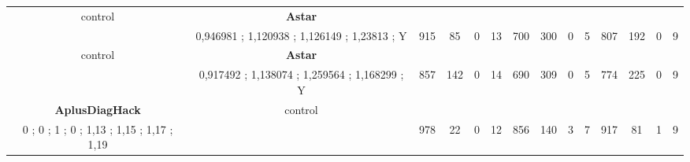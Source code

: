 \begin{table}[]
{\begin{tabular}{|c|c|c|c|c|c|c|c|c|c|c|c|c|c|}
control & \cellcolor{blue!15}\textbf{Astar}& {\color[HTML]{00009B} } & {\color[HTML]{9A0000} } & {\color[HTML]{009901} } &  & {\color[HTML]{00009B} } & {\color[HTML]{9A0000} } & {\color[HTML]{009901} } &  & {\color[HTML]{00009B} } & {\color[HTML]{9A0000} } & {\color[HTML]{009901} } &  \\ 
 & \cellcolor{ blue!15}0,946981 ; 1,120938 ; 1,126149 ; 1,23813 ; Y & \multirow{-2}{*}{{\color[HTML]{00009B} 915}} & \multirow{-2}{*}{{\color[HTML]{9A0000} 85}} & \multirow{-2}{*}{{\color[HTML]{009901} 0}} & \multirow{-2}{*}{13} & \multirow{-2}{*}{{\color[HTML]{00009B} 700}} & \multirow{-2}{*}{{\color[HTML]{9A0000} 300}} & \multirow{-2}{*}{{\color[HTML]{009901} 0}} & \multirow{-2}{*}{5} & \multirow{-2}{*}{{\color[HTML]{00009B} 807}} & \multirow{-2}{*}{{\color[HTML]{9A0000} 192}} & \multirow{-2}{*}{{\color[HTML]{009901} 0}} & \multirow{-2}{*}{9} \\ \hline

control & \cellcolor{blue!15}\textbf{Astar}& {\color[HTML]{00009B} } & {\color[HTML]{9A0000} } & {\color[HTML]{009901} } &  & {\color[HTML]{00009B} } & {\color[HTML]{9A0000} } & {\color[HTML]{009901} } &  & {\color[HTML]{00009B} } & {\color[HTML]{9A0000} } & {\color[HTML]{009901} } &  \\ 
 & \cellcolor{ blue!15}0,917492 ; 1,138074 ; 1,259564 ; 1,168299 ; Y & \multirow{-2}{*}{{\color[HTML]{00009B} 857}} & \multirow{-2}{*}{{\color[HTML]{9A0000} 142}} & \multirow{-2}{*}{{\color[HTML]{009901} 0}} & \multirow{-2}{*}{14} & \multirow{-2}{*}{{\color[HTML]{00009B} 690}} & \multirow{-2}{*}{{\color[HTML]{9A0000} 309}} & \multirow{-2}{*}{{\color[HTML]{009901} 0}} & \multirow{-2}{*}{5} & \multirow{-2}{*}{{\color[HTML]{00009B} 774}} & \multirow{-2}{*}{{\color[HTML]{9A0000} 225}} & \multirow{-2}{*}{{\color[HTML]{009901} 0}} & \multirow{-2}{*}{9} \\ \hline


\cellcolor{blue!15}\textbf{AplusDiagHack} & control& {\color[HTML]{00009B} } & {\color[HTML]{9A0000} } & {\color[HTML]{009901} } &  & {\color[HTML]{00009B} } & {\color[HTML]{9A0000} } & {\color[HTML]{009901} } &  & {\color[HTML]{00009B} } & {\color[HTML]{9A0000} } & {\color[HTML]{009901} } &  \\ 
\cellcolor{ blue!15}0 ; 0 ; 1 ; 0 ; 1,13 ; 1,15 ; 1,17 ; 1,19 &  & \multirow{-2}{*}{{\color[HTML]{00009B} 978}} & \multirow{-2}{*}{{\color[HTML]{9A0000} 22}} & \multirow{-2}{*}{{\color[HTML]{009901} 0}} & \multirow{-2}{*}{12} & \multirow{-2}{*}{{\color[HTML]{00009B} 856}} & \multirow{-2}{*}{{\color[HTML]{9A0000} 140}} & \multirow{-2}{*}{{\color[HTML]{009901} 3}} & \multirow{-2}{*}{7} & \multirow{-2}{*}{{\color[HTML]{00009B} 917}} & \multirow{-2}{*}{{\color[HTML]{9A0000} 81}} & \multirow{-2}{*}{{\color[HTML]{009901} 1}} & \multirow{-2}{*}{9} \\ \hline


\end{tabular}}
\end{table}
